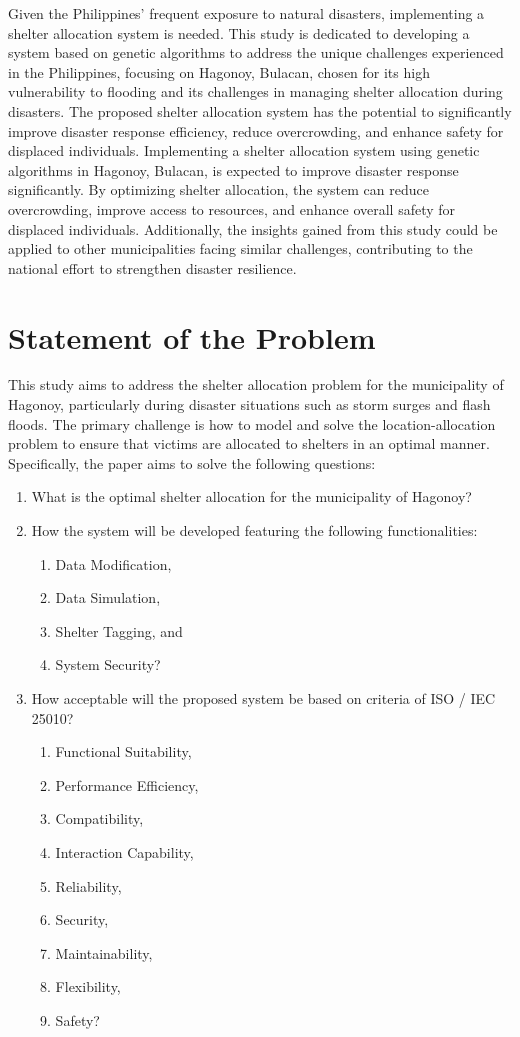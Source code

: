 	Given the Philippines' frequent exposure to natural disasters, implementing a shelter allocation system is needed. This study is dedicated to developing a system based on genetic algorithms to address the unique challenges experienced in the Philippines, focusing on Hagonoy, Bulacan, chosen for its high vulnerability to flooding and its challenges in managing shelter allocation during disasters. The proposed shelter allocation system has the potential to significantly improve disaster response efficiency, reduce overcrowding, and enhance safety for displaced individuals. Implementing a shelter allocation system using genetic algorithms in Hagonoy, Bulacan, is expected to improve disaster response significantly. By optimizing shelter allocation, the system can reduce overcrowding, improve access to resources, and enhance overall safety for displaced individuals. Additionally, the insights gained from this study could be applied to other municipalities facing similar challenges, contributing to the national effort to strengthen disaster resilience. 

\section{Statement of the Problem}
	This study aims to address the shelter allocation problem for the municipality of Hagonoy, particularly during disaster situations such as storm surges and flash floods. The primary challenge is how to model and solve the location-allocation problem to ensure that victims are allocated to shelters in an optimal manner. Specifically, the paper aims to solve the following questions:
	
	\begin{enumerate}
		\item What is the optimal shelter allocation for the municipality of Hagonoy?
		\item How the system will be developed featuring the following functionalities:
		\begin{enumerate}
			\item Data Modification,
			\item Data Simulation,
			\item Shelter Tagging, and
			\item System Security?
		\end{enumerate}
		\item How acceptable will the proposed system be based on criteria of ISO / IEC 25010?
		\begin{enumerate}
			\item Functional Suitability,
			\item Performance Efficiency,
			\item Compatibility,
			\item Interaction Capability,
			\item Reliability,
			\item Security,
			\item Maintainability,
			\item Flexibility,
			\item Safety?
		\end{enumerate}
	\end{enumerate}
	
